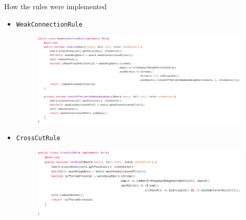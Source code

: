 \documentclass{beamer}
\begin{document}
\begin{frame}[t]{How the rules were implemented }
 \begin{itemize}
  \item \texttt{WeakConnectionRule}
  \vspace{0.4cm}
  \
  \begin{figure}
   \center\includegraphics[scale=0.19]{images/weak-connection-rule-code.png}
  \end{figure}
  \item \texttt{CrossCutRule}
  \vspace{0.4cm}
  \begin{figure}
   \center\includegraphics[scale=0.2]{images/cross-cut-rule-code.png}
  \end{figure}
 \end{itemize}
\end{frame}
\end{document}
